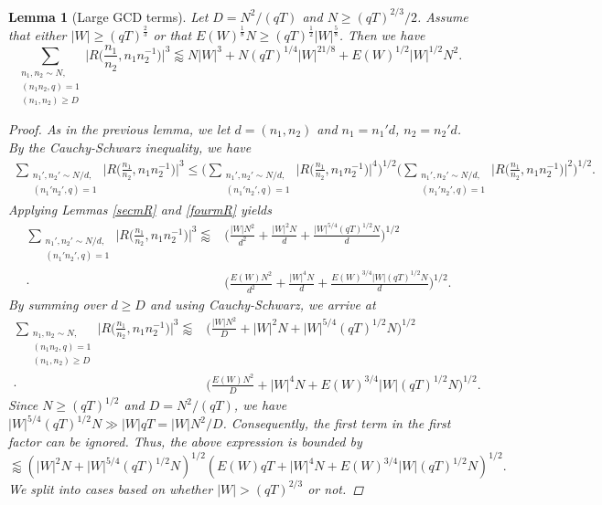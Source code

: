 \documentclass[12pt]{amsart}
\newtheorem{lemma}[theorem]{Lemma}
\theoremstyle{definition}
\theoremstyle{plain}
\theoremstyle{remark}
\numberwithin{equation}{section}
\numberwithin{theorem}{section}
\numberwithin{equation}{section}
\begin{document}
	\begin{lemma}[Large GCD terms] \label{lgcd}
		Let $D=N^{2}/(qT)$ and $N \geq (qT)^{2/3}/2$. Assume that either $|W|\geq (qT)^{\frac{2}{3}}$ or that $E(W)^{\frac{1}{8}}N \geq (qT)^{\frac{1}{2}}|W|^{\frac{5}{8}}$. Then we have 
		\[\sum_{\substack{n_{1}, n_{2} \sim N, \\ (n_{1}n_{2}, q)=1  \\ (n_{1}, n_{2}) \geq D}}\bigg|R\bigg(\frac{n_{1}}{n_{2}}, n_{1}n_{2}^{-1}\bigg)\bigg|^{3} \lessapprox N|W|^{3}+N(qT)^{1/4}|W|^{21/8}+E(W)^{1/2}|W|^{1/2}N^{2}.\]
		\begin{proof}
			As in the previous lemma, we let $d=(n_{1}, n_{2})$ and $n_{1}=n_{1}'d$, $n_{2}=n_{2}'d$. By the Cauchy-Schwarz inequality, we have
			\begin{align*}
				\sum_{\substack{n_{1}', n_{2}' \sim N/d, \\ (n_{1}'n_{2}', q)=1}}\bigg|R\bigg(\frac{n_{1}}{n_{2}}, n_{1}n_{2}^{-1}\bigg)\bigg|^{3} \leq \bigg(\sum_{\substack{n_{1}', n_{2}' \sim N/d, \\ (n_{1}'n_{2}', q)=1}}\bigg|R\bigg(\frac{n_{1}}{n_{2}}, n_{1}n_{2}^{-1}\bigg)\bigg|^{4}\bigg)^{1/2}
				\bigg(\sum_{\substack{n_{1}', n_{2}' \sim N/d, \\ (n_{1}'n_{2}', q)=1}}\bigg|R\bigg(\frac{n_{1}}{n_{2}}, n_{1}n_{2}^{-1}\bigg)\bigg|^{2}\bigg)^{1/2}.
			\end{align*} 
			Applying Lemmas \ref{secmR} and \ref{fourmR}  yields
			\begin{align*}
				\sum_{\substack{n_{1}', n_{2}' \sim N/d, \\ (n_{1}'n_{2}', q)=1}}\bigg|R\bigg(\frac{n_{1}}{n_{2}}, n_{1}n_{2}^{-1}\bigg)\bigg|^{3}
				\lessapprox& \bigg(\frac{|W|N^{2}}{d^{2}}+\frac{|W|^{2}N}{d}+\frac{|W|^{5/4}(qT)^{1/2}N}{d}\bigg)^{1/2}
				\\
				\cdot&\bigg(\frac{E(W)N^{2}}{d^{2}}+\frac{|W|^{4}N}{d}+\frac{E(W)^{3/4}|W|(qT)^{1/2}N}{d}\bigg)^{1/2}.
			\end{align*} 
			By summing over $d \geq D$ and using Cauchy-Schwarz, we arrive at
			\begin{align*}
				\sum_{\substack{n_{1}, n_{2} \sim N, \\ (n_{1}n_{2}, q)=1 \\ (n_{1}, n_{2})\geq D}}\bigg|R\bigg(\frac{n_{1}}{n_{2}}, n_{1}n_{2}^{-1}\bigg)\bigg|^{3}
				\lessapprox& \bigg(\frac{|W|N^{2}}{D}+|W|^{2}N+|W|^{5/4}(qT)^{1/2}N\bigg)^{1/2}
				\\
				\cdot&\bigg(\frac{E(W)N^{2}}{D}+|W|^{4}N+E(W)^{3/4}|W|(qT)^{1/2}N\bigg)^{1/2}.
			\end{align*} 
			Since $N \geq (qT)^{1/2}$ and $D=N^{2}/(qT)$, we have $|W|^{5/4}(qT)^{1/2}N \gg |W|qT=|W|N^{2}/D$. Consequently, the first term in the first factor can be ignored. Thus, the above expression is bounded by
			\[\lessapprox (|W|^{2}N+|W|^{5/4}(qT)^{1/2}N)^{1/2}
			(E(W)qT+|W|^{4}N+E(W)^{3/4}|W|(qT)^{1/2}N)^{1/2}.\]
			We split into cases based on whether $|W| > (qT)^{2/3}$ or not.
			

\end{proof}
\end{lemma}
\end{document}
